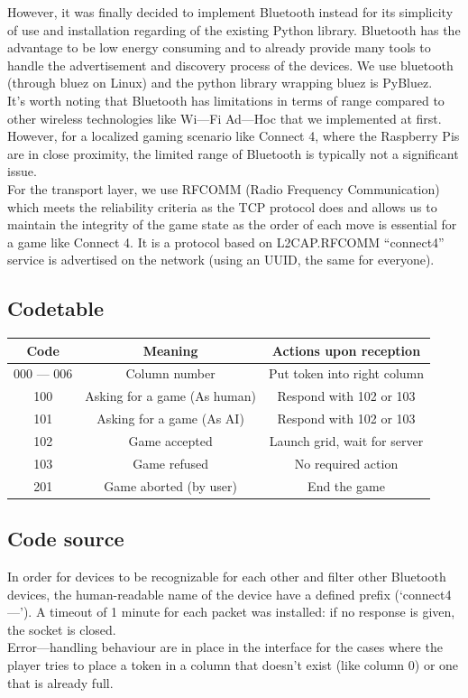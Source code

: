 \documentclass[11pt, a4paper, oneside]{report}
\begin{document}
	However, it was finally decided to implement Bluetooth instead for its simplicity of use and installation regarding of the existing Python library. Bluetooth has the advantage to be low energy consuming and to already provide many tools to handle the advertisement and discovery process of the devices. We use bluetooth (through bluez on Linux) and the python library wrapping bluez is PyBluez. \\
	
	It's worth noting that Bluetooth has limitations in terms of range compared to other wireless technologies like Wi—Fi Ad—Hoc that we implemented at first. However, for a localized gaming scenario like Connect 4, where the Raspberry Pis are in close proximity, the limited range of Bluetooth is typically not a significant issue. \\

	For the transport layer, we use RFCOMM (Radio Frequency Communication) which meets the reliability criteria as the TCP protocol does and allows us to maintain the integrity of the game state as the order of each move is essential for a game like Connect 4. It is a protocol based on L2CAP.\@ RFCOMM “connect4” service is advertised on the network (using an UUID, the same for everyone). 

	\subsection{Codetable}
	\begin{tabular}{ |c|c|c| }
		\toprule
		Code & Meaning & Actions upon reception \\
		\midrule
		000 — 006 & Column number & Put token into right column \\
		100 & Asking for a game (As human) & Respond with 102 or 103 \\
		101 & Asking for a game (As AI) & Respond with 102 or 103 \\
		102 & Game accepted & Launch grid, wait for server \\
		103 & Game refused & No required action \\
		201 & Game aborted (by user) & End the game \\
		\bottomrule
	  \end{tabular}

	\subsection{Code source}
	In order for devices to be recognizable for each other and filter other Bluetooth devices, the human-readable name of the device have a defined prefix (`connect4—'). A timeout of 1 minute for each packet was installed: if no response is given, the socket is closed. \\
	Error—handling behaviour are in place in the interface for the cases where the player tries to place a token in a column that doesn’t exist (like column 0) or one that is already full. \\
\end{document}

